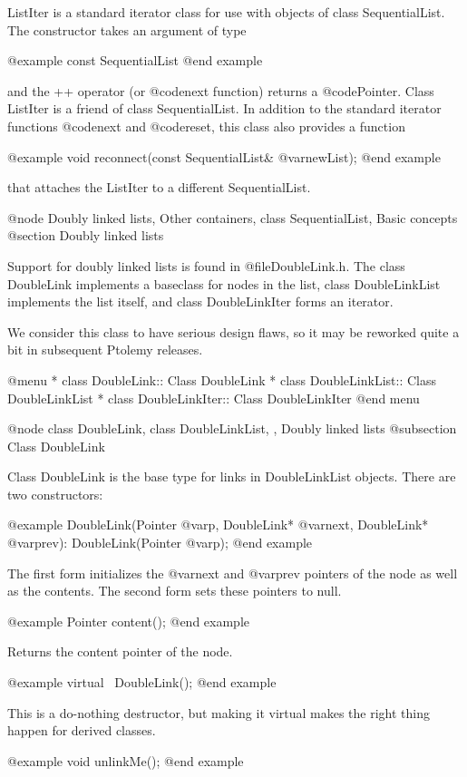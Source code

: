 ListIter is a standard iterator class for use with objects of class
SequentialList.  The constructor takes an argument of type

@example
const SequentialList
@end example

and the ++ operator (or @code{next} function) returns a @code{Pointer}.
Class ListIter is a friend of class SequentialList.
In addition to the standard iterator functions @code{next} and
@code{reset}, this class also provides a function

@example
void reconnect(const SequentialList& @var{newList});
@end example

that attaches the ListIter to a different SequentialList.

@node Doubly linked lists, Other containers, class SequentialList, Basic concepts
@section Doubly linked lists

Support for doubly linked lists is found in @file{DoubleLink.h}.  The class
DoubleLink implements a baseclass for nodes in the list, class
DoubleLinkList implements the list itself, and class DoubleLinkIter forms an
iterator.

We consider this class to have serious design flaws, so it may be
reworked quite a bit in subsequent Ptolemy releases.

@menu
* class DoubleLink::  Class DoubleLink
* class DoubleLinkList::  Class DoubleLinkList
* class DoubleLinkIter::  Class DoubleLinkIter
@end menu

@node class DoubleLink, class DoubleLinkList,  , Doubly linked lists
@subsection Class DoubleLink

Class DoubleLink is the base type for links in DoubleLinkList objects.
There are two constructors:

@example
DoubleLink(Pointer @var{p}, DoubleLink* @var{next}, DoubleLink* @var{prev}):
DoubleLink(Pointer @var{p});
@end example

The first form initializes the @var{next} and @var{prev} pointers of the
node as well as the contents.  The second form sets these pointers to null.

@example
Pointer content();
@end example

Returns the content pointer of the node.

@example
virtual ~DoubleLink();
@end example

This is a do-nothing destructor, but making it virtual makes the right
thing happen for derived classes.

@example
void unlinkMe();
@end example

